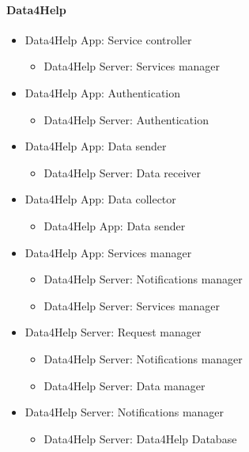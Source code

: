 		\paragraph{Data4Help}
		\begin{itemize}

			\item{Data4Help App: Service controller}
			\begin{itemize}\item{Data4Help Server: Services manager}\end{itemize}

			\item{Data4Help App: Authentication}
			\begin{itemize}\item{Data4Help Server: Authentication}\end{itemize}

			\item{Data4Help App: Data sender}
			\begin{itemize}\item{Data4Help Server: Data receiver}\end{itemize}

			\item{Data4Help App: Data collector}
			\begin{itemize}\item{Data4Help App: Data sender}\end{itemize}

			\item{Data4Help App: Services manager}
			\begin{itemize}\item{Data4Help Server: Notifications manager}\item{Data4Help Server: Services manager}\end{itemize}

			\item{Data4Help Server: Request manager}
			\begin{itemize}\item{Data4Help Server: Notifications manager}\item{Data4Help Server: Data manager}\end{itemize}

			\item{Data4Help Server: Notifications manager}
			\begin{itemize}\item{Data4Help Server: Data4Help Database}\end{itemize}


\end{itemize}
